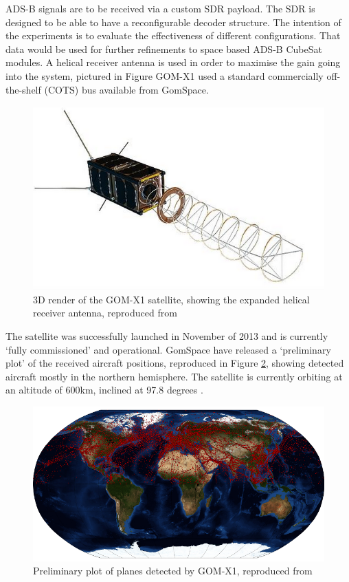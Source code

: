 ADS-B signals are to be received via a custom SDR payload. The SDR is designed to be able to have a reconfigurable decoder structure. The intention of the experiments is to evaluate the effectiveness of different configurations. That data would be used for further refinements to space based ADS-B CubeSat modules. A helical receiver antenna is used in order to maximise the gain going into the system, pictured in Figure  GOM-X1 used a standard commercially off-the-shelf (COTS) bus available from GomSpace\cite{Alminde2012}.
\begin{figure}[H]
	\centering
	\includegraphics[scale = 0.5]{Pictures/gomx_antenna.png}
	
	\caption[3D render of the GOM-X1 satellite, showing the expanded helical receiver antenna]{3D render of the GOM-X1 satellite, showing the expanded helical receiver antenna, reproduced from \cite{GomSpace2014}}
	\label{fig:gomx_antenna}
\end{figure}
The satellite was successfully launched in November of 2013 and is currently `fully commissioned' and operational. GomSpace have released a `preliminary plot' of the received aircraft positions, reproduced in Figure \ref{fig:gomx_planes}, showing detected aircraft mostly in the northern hemisphere. The satellite is currently orbiting at an altitude of 600km, inclined at 97.8 degrees \cite{EoPortal}. 

\begin{figure}[htbp]
	\centering
	\includegraphics[scale = 0.8]{Pictures/gomx_planes.png}
	
	\caption[Preliminary plot of planes detected by GOM-X1]{Preliminary plot of planes detected by GOM-X1, reproduced from \cite{GomSpace2014}}
	\label{fig:gomx_planes}
\end{figure}

